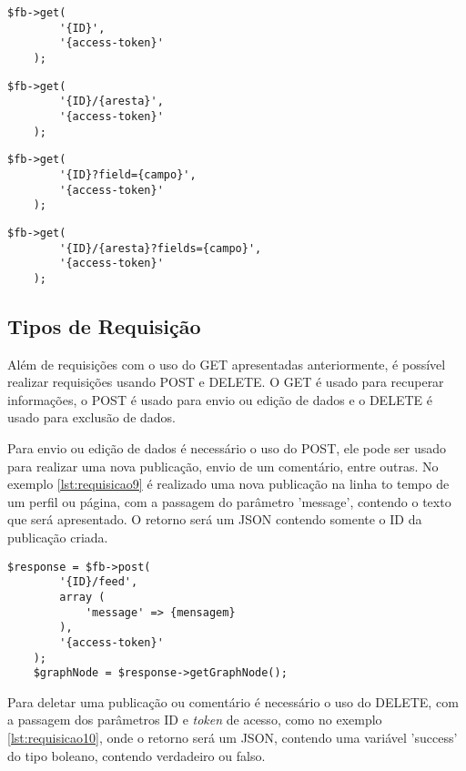 \begin{lstlisting}[caption={Requisição com o uso do ID},label={lst:requisicoes1}]
	$fb->get(
    	'{ID}',
    	'{access-token}'
  	);
\end{lstlisting}

\begin{lstlisting}[caption={Requisição com o uso do ID+aresta},label={lst:requisicoes2}]
	$fb->get(
    	'{ID}/{aresta}',
    	'{access-token}'
  	);
\end{lstlisting}

\begin{lstlisting}[caption={Requisição com o uso do ID+campo},label={lst:requisicoes3}]
	$fb->get(
		'{ID}?field={campo}',
   		'{access-token}'
	);
\end{lstlisting}

\begin{lstlisting}[caption={Requisição com o uso do ID+aresta+campo},label={lst:requisicoes4}]
	$fb->get(
		'{ID}/{aresta}?fields={campo}',
    	'{access-token}'
	);
\end{lstlisting}

\subsection{Tipos de Requisição}
Além de requisições com o uso do GET apresentadas anteriormente, é possível realizar requisições usando POST e DELETE. O GET é usado para recuperar informações, o POST é usado para envio ou edição de dados e o DELETE é usado para exclusão de dados.

Para envio ou edição de dados é necessário o uso do POST, ele pode ser usado para realizar uma nova publicação, envio de um comentário, entre outras. No exemplo \ref{lst:requisicao9} é realizado uma nova publicação na linha to tempo de um perfil ou página, com a passagem do parâmetro 'message', contendo o texto que será apresentado. O retorno será um JSON contendo somente o ID da publicação criada.

\begin{lstlisting}[caption={Requsição POST},label={lst:requisicao9}]
	$response = $fb->post(
   		'{ID}/feed',
    	array (
      		'message' => {mensagem}
    	),
    	'{access-token}'
  	);
	$graphNode = $response->getGraphNode();
\end{lstlisting}

Para deletar uma publicação ou comentário é necessário o uso do DELETE, com a passagem dos parâmetros ID e \textit{token} de acesso, como no exemplo \ref{lst:requisicao10}, onde o retorno será um JSON, contendo uma variável 'success' do tipo boleano, contendo verdadeiro ou falso.

